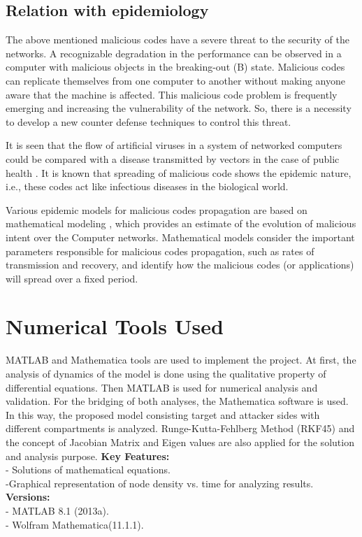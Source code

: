 \subsection{Relation with epidemiology}
The above mentioned malicious codes have a severe threat to the security of the networks. A recognizable degradation in the performance
can be observed in a computer with malicious objects in the breaking-out (B) state. Malicious codes can replicate themselves from one computer
 to another without making anyone aware that the machine is affected. This malicious code problem is frequently emerging and increasing the
vulnerability of the network. So, there is a necessity to develop a new counter defense techniques to control this threat.
\par It is seen that the flow of artificial viruses in a system of networked computers could be compared with a disease transmitted
 by vectors in the case of public health \cite{edtr1}. It is known that spreading of malicious code shows the epidemic nature, i.e., these codes
 act like infectious diseases in the biological world.
\par Various epidemic models for malicious codes propagation are based on mathematical modeling \cite{edtr4}, which provides an estimate of
the evolution of malicious intent over the Computer networks. Mathematical models consider the important parameters responsible for malicious codes
 propagation, such as rates of transmission and recovery, and identify how the malicious codes (or applications) will spread over a fixed period.
\section{Numerical Tools Used}

MATLAB and Mathematica tools are used to implement the project.
At first, the analysis of dynamics of the model is done using the qualitative property of differential equations. Then MATLAB is used for  numerical analysis and validation. For the bridging of both analyses, the Mathematica
software is used. In this way, the proposed model consisting
target and attacker sides with different compartments is analyzed.
Runge-Kutta-Fehlberg Method (RKF45)\cite{edtr22} and the concept of Jacobian Matrix and Eigen values are also applied for the solution and analysis purpose.
\clearpage
{\bf Key Features:} \\
- Solutions of mathematical equations.\\
-Graphical representation of node density vs. time for analyzing results. \\
{\bf Versions:}\\
- MATLAB 8.1 (2013a).\\
- Wolfram Mathematica(11.1.1).

